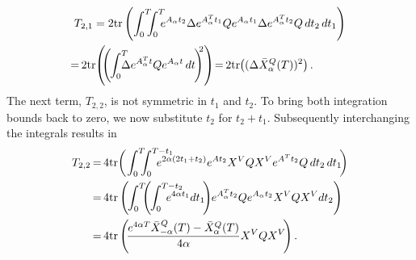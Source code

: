 \documentclass[twocolumn]{autart}
\begin{document}
\begin{pf}
\begin{align}
& T_{2,1} = 2\tr\left(\int_0^T \hspace{-6pt} \int_0^T \hspace{-6pt} e^{A_\alpha t_2} \Delta e^{A_\alpha^T t_1} Q e^{A_\alpha t_1} \Delta e^{A_\alpha^T t_2} Q \, dt_2 \, dt_1\right) \nonumber \\
& \hspace{-6pt} = \hspace{-1pt} 2\tr\hspace{-2pt}\left(\hspace{-4pt}\left.\left(\hspace{-1pt}\int_0^T \hspace{-8pt} \Delta e^{A_\alpha^T t} Q e^{A_\alpha t} \, dt\hspace{-1pt}\right)\hspace{-5pt}\right.^2 \right) \hspace{-2pt} = \hspace{-1pt} 2\tr\hspace{-2pt}\left((\Delta \bar{X}_\alpha^Q(T))^2\right). \label{eq:T21Expression}
\end{align}
The next term, $T_{2,2}$, is not symmetric in $t_1$ and $t_2$. To bring both integration bounds back to zero, we now substitute $t_2$ for $t_2 + t_1$. Subsequently interchanging the integrals results in
\begin{align}
T_{2,2} & \hspace{-1pt}=\hspace{-1pt} 4\tr\bigg(\hspace{-1pt}\int_0^T \hspace{-6pt} \int_0^{T-t_1} \hspace{-17pt} e^{2\alpha(2t_1 + t_2)} e^{At_2} X^V Q X^V e^{A^T t_2} Q \, dt_2 \, dt_1\hspace{-2pt}\bigg) \nonumber \\
& \hspace{-1pt}=\hspace{-1pt} 4\tr\left(\hspace{-1pt}\int_0^T \hspace{-5pt} \left(\hspace{-1pt}\int_0^{T-t_2} \hspace{-17pt} e^{4\alpha t_1} dt_1\hspace{-2pt}\right)\hspace{-2pt} e^{A_\alpha ^T t_2} Q e^{A_\alpha t_2} X^V Q X^V dt_2\right) \nonumber \\
& \hspace{-1pt}=\hspace{-1pt} 4\tr\left(\hspace{-2pt}\frac{e^{4\alpha T} \bar{X}_{-\alpha}^Q(T) - \bar{X}_\alpha^Q(T)}{4\alpha} X^V Q X^V\hspace{-2pt}\right).

\end{align}
\end{pf}
\end{document}
